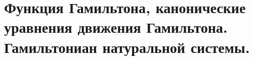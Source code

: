 \section{Функция Гамильтона, канонические уравнения движения Гамильтона. Гамильтониан натуральной системы.}\label{chasec17}



\newpage